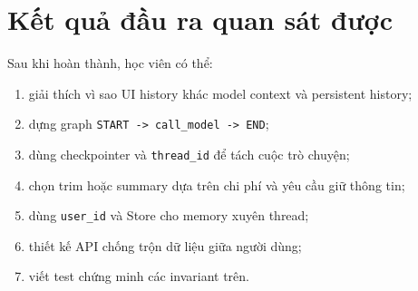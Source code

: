 \section*{Kết quả đầu ra quan sát được}

Sau khi hoàn thành, học viên có thể:
\begin{enumerate}
  \item giải thích vì sao UI history khác model context và persistent history;
  \item dựng graph \texttt{START -> call\_model -> END};
  \item dùng checkpointer và \texttt{thread\_id} để tách cuộc trò chuyện;
  \item chọn trim hoặc summary dựa trên chi phí và yêu cầu giữ thông tin;
  \item dùng \texttt{user\_id} và Store cho memory xuyên thread;
  \item thiết kế API chống trộn dữ liệu giữa người dùng;
  \item viết test chứng minh các invariant trên.
\end{enumerate}
